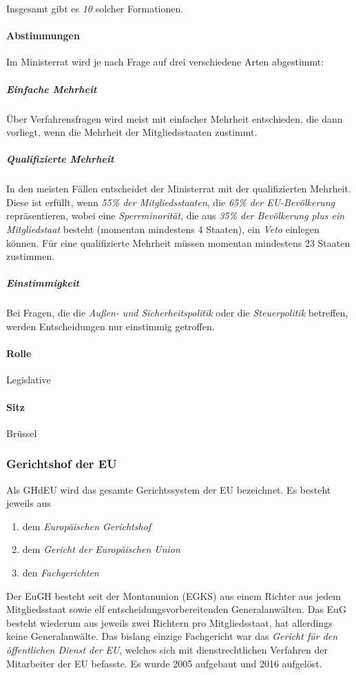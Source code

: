 \documentclass{article}
\begin{document}
	Insgesamt gibt es \textit{10} solcher Formationen. 

	\paragraph{Abstimmungen}
	Im Ministerrat wird je nach Frage auf drei verschiedene Arten abgestimmt:

	\subparagraph{Einfache Mehrheit}
	Über Verfahrensfragen wird meist mit einfacher Mehrheit entschieden, die dann vorliegt, wenn die Mehrheit der Mitgliedsstaaten zustimmt.

	 \subparagraph{Qualifizierte Mehrheit}
	 In den meisten Fällen entscheidet der Ministerrat mit der qualifizierten Mehrheit. Diese ist erfüllt, wenn \textit{55\% der Mitgliedsstaaten}, die \textit{65\% der EU-Bevölkerung} repräsentieren, wobei eine \textit{Sperrminorität}, die aus \textit{35\% der Bevölkerung plus ein Mitgliedstaat} besteht (momentan mindestens 4 Staaten), ein \textit{Veto} einlegen können. Für eine qualifizierte Mehrheit müssen momentan mindestens 23 Staaten zustimmen.

	 \subparagraph{Einstimmigkeit}
	 Bei Fragen, die die \textit{Außen- und Sicherheitspolitik} oder die \textit{Steuerpolitik} betreffen, werden Entscheidungen nur einstimmig getroffen.

	\paragraph{Rolle}
	Legislative

	\paragraph{Sitz}
	Brüssel

	\subsubsection{Gerichtshof der EU}
	Als GHdEU wird das gesamte Gerichtssystem der EU bezeichnet. Es besteht jeweils aus

	\begin{enumerate}
		\item dem \textit{Europäischen Gerichtshof}
		\item dem \textit{Gericht der Europäischen Union}
		\item den \textit{Fachgerichten}
	\end{enumerate}

	Der EuGH besteht seit der Montanunion (EGKS) aus einem Richter aus jedem Mitgliedsstaat sowie elf entscheidungsvorbereitenden Generalanwälten. Das EuG  besteht wiederum aus jeweils zwei Richtern pro Mitgliedsstaat, hat allerdings keine Generalanwälte.
	Das bislang einzige Fachgericht war das \textit{Gericht für den öffentlichen Dienst der EU}, welches sich mit dienstrechtlichen Verfahren der Mitarbeiter der EU befasste. Es wurde 2005 aufgebaut und 2016 aufgelöst.
\end{document}
